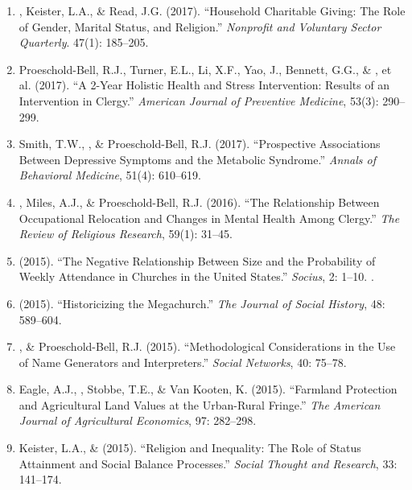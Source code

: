 \begin{enumerate}
\item \Eagle, Keister, L.A., \& Read, J.G. (2017). ``Household Charitable Giving: The Role of Gender, Marital Status, and Religion.'' \emph{Nonprofit and Voluntary Sector Quarterly}. 47(1): 185--205. 

\item Proeschold-Bell, R.J., Turner, E.L., Li, X.F., Yao, J., Bennett, G.G., \& \Eagle, et al. (2017). ``A 2-Year Holistic Health and Stress Intervention: Results of an Intervention in Clergy.'' \emph{American Journal of Preventive Medicine}, 53(3): 290--299. 

\item Smith, T.W., \Eagle\CF, \& Proeschold-Bell, R.J. (2017). ``Prospective Associations Between Depressive Symptoms and the Metabolic Syndrome.'' \emph{Annals of Behavioral Medicine}, 51(4): 610--619. 

\item \Eagle, Miles, A.J., \& Proeschold-Bell, R.J. (2016). ``The Relationship Between Occupational Relocation and Changes in Mental Health Among Clergy.'' \emph{The Review of Religious Research}, 59(1): 31--45. 

\item \Eagle \hspace{.01em} (2015). ``The Negative Relationship Between Size and the Probability of Weekly Attendance in Churches in the United States.'' \emph{Socius}, 2: 1--10. .

\item \Eagle \hspace{.01em} (2015). ``Historicizing the Megachurch.'' \textit{The Journal of Social History}, 48: 589--604. 

\item \Eagle, \& Proeschold-Bell, R.J. (2015). ``Methodological Considerations in the Use of Name Generators and Interpreters.'' \emph{Social Networks}, 40: 75--78. 

\item Eagle, A.J., \Eagle, Stobbe, T.E., \& Van Kooten, K. (2015). ``Farmland Protection and Agricultural Land Values at the Urban-Rural Fringe.'' \emph{The American Journal of Agricultural Economics}, 97: 282--298. 

\item Keister, L.A., \& \Eagle \hspace{.01em} (2015). ``Religion and Inequality: The Role of Status Attainment and Social Balance Processes.'' \emph{Social Thought and Research}, 33: 141--174.


\end{enumerate}

